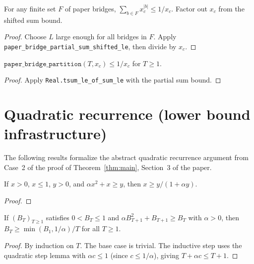\begin{lemma}\label{lem:paper_bridge_partial_sum}
\leanok
{}
  For any finite set $F$ of paper bridges,
  $\sum_{b \in F} x_c^{|b|} \leq 1/x_c$.
  Factor out $x_c$ from the shifted sum bound.
\end{lemma}
\begin{proof}
\leanok
{}
  Choose $L$ large enough for all bridges in $F$.
  Apply \texttt{paper\_bridge\_partial\_sum\_shifted\_le},
  then divide by $x_c$.
\end{proof}

\begin{theorem}\label{thm:paper_bridge_upper}
\leanok
{}
  $\texttt{paper\_bridge\_partition}(T, x_c) \leq 1/x_c$ for $T \geq 1$.
\end{theorem}
\begin{proof}
  Apply \texttt{Real.tsum\_le\_of\_sum\_le} with the partial sum bound.
\end{proof}

\section{Quadratic recurrence (lower bound infrastructure)}

The following results formalize the abstract quadratic recurrence argument
from Case~2 of the proof of Theorem~\ref{thm:main}, Section~3 of the paper.

\begin{lemma}\label{lem:quad_step}
\leanok
  If $x > 0$, $x \leq 1$, $y > 0$, and $\alpha x^2 + x \geq y$,
  then $x \geq y / (1 + \alpha y)$.
\end{lemma}
\begin{proof}
\leanok
\end{proof}

\begin{theorem}\label{thm:quad_lower}
\leanok
{}
  If $(B_T)_{T \geq 1}$ satisfies $0 < B_T \leq 1$ and
  $\alpha B_{T+1}^2 + B_{T+1} \geq B_T$ with $\alpha > 0$,
  then $B_T \geq \min(B_1, 1/\alpha) / T$ for all $T \geq 1$.
\end{theorem}
\begin{proof}
\leanok
{}
  By induction on $T$. The base case is trivial. The inductive step
  uses the quadratic step lemma with $\alpha c \leq 1$ (since $c \leq 1/\alpha$),
  giving $T + \alpha c \leq T + 1$.
\end{proof}

